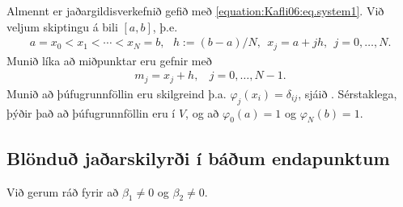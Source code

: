 \documentclass[a4paper,10pt,icelandic]{sphinxmanual}
\begin{document}
Almennt er jaðargildisverkefnið gefið með \eqref{equation:Kafli06:eq.system1}.
Við veljum skiptingu á bili \([a,b]\), þ.e.
\begin{equation*}
\begin{split}a=x_0<x_1<\cdots<x_N=b, ~~~ h:= (b-a)/N, ~~ x_j= a+j h, ~~j=0, \dots, N.\end{split}
\end{equation*}
Munið líka að miðpunktar eru gefnir með
\begin{equation*}
\begin{split}m_j= x_j+ h,~~~~j=0, \dots, N-1.\end{split}
\end{equation*}
Munið að þúfugrunnföllin eru skilgreind þ.a. \(\varphi_j(x_i)=\delta_{ij}\), sjáið {\hyperref[\detokenize{Kafli05:ch-5-2-2}]{}}.
Sérstaklega, þýðir það að þúfugrunnföllin eru í \(V\), og að \(\varphi_0(a)=1\) og \(\varphi_N(b)=1\).


\subsection{Blönduð jaðarskilyrði í báðum endapunktum}
\label{\detokenize{Kafli06:blondu-jaarskilyri-i-baum-endapunktum}}
Við gerum ráð fyrir að \(\beta_1\neq 0\) og \(\beta_2\neq 0\).
\end{document}
